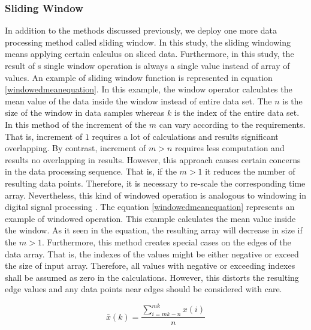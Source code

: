 \documentclass[english,12pt,a4paper,pdftex,elec,utf8]{aaltothesis}
\begin{document}

\subsubsection{Sliding Window} \label{slidingwindowsection}

In addition to the methods discussed previously, we deploy one more data processing method called sliding window. In this study, the sliding windowing means applying certain calculus on sliced data. Furthermore, in this study, the result of s single window operation is always a single value instead of array of values. An example of sliding window function is represented in equation \ref{windowedmeanequation}. In this example, the window operator calculates the mean value of the data inside the window instead of entire data set. The $n$ is the size of the window in data samples whereas $k$ is the index of the entire data set. In this method of the increment of the $m$ can vary according to the requirements. That is, increment of $1$ requires a lot of calculations and results significant overlapping. By contrast, increment of $m > n$ requires less computation and results no overlapping in results. However, this approach causes certain concerns in the data processing sequence. That is, if the $m > 1$ it reduces the number of resulting data points. Therefore, it is necessary to re-scale the corresponding time array. Nevertheless, this kind of windowed operation is analogous to windowing in digital signal processing \cite{tan2007digital} \cite{miao2007signal}. The equation \ref{windowedmeanequation} represents an example of windowed operation. This example calculates the mean value inside the window. As it seen in the equation, the resulting array will decrease in size if the $m > 1$. Furthermore, this method creates special cases on the edges of the data array. That is, the indexes of the values might be either negative or exceed the size of input array. Therefore, all values with negative or exceeding indexes shall be assumed as zero in the calculations. However, this distorts the resulting edge values and any data points near edges should be considered with care.

\begin{equation} \label{windowedmeanequation}
\bar{x}(k) = \frac{ \sum\limits^{mk}_{i = mk - n} x(i)}{n}
\end{equation} 

\end{document}
